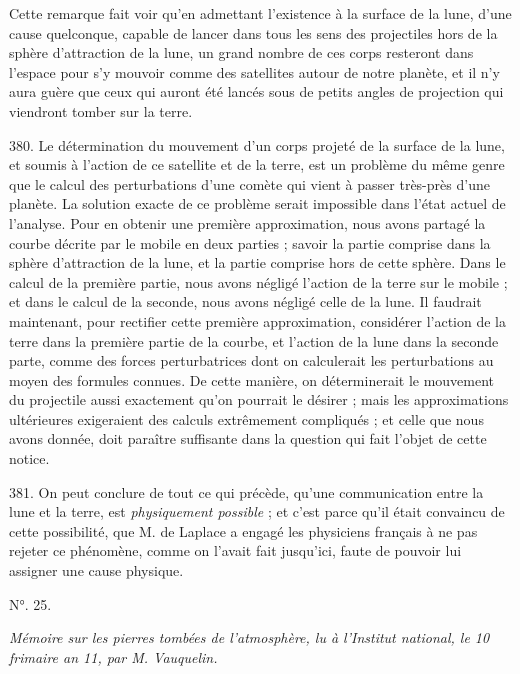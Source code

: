 \documentclass[a4paper, 11pt, oneside, polutonikogreek, french]{article}
\begin{document}
Cette remarque fait voir qu'en admettant l'existence à la surface de la lune, d'une cause quelconque, capable de lancer dans tous les sens des projectiles hors de la sphère d'attraction de la lune, un grand nombre de ces corps resteront dans l'espace pour s'y mouvoir comme des satellites autour de notre planète, et il n'y aura guère que ceux qui auront été lancés sous de petits angles de projection qui viendront tomber sur la terre.

380. Le détermination du mouvement d'un corps projeté de la surface de la lune, et soumis à l'action de ce satellite et de la terre, est un problème du même genre que le calcul des perturbations d'une comète qui vient à passer très-près d'une planète. La solution exacte de ce problème serait impossible dans l'état actuel de l'analyse. Pour en obtenir une première approximation, nous avons partagé la courbe décrite par le mobile en deux parties ; savoir la partie comprise dans la sphère d'attraction de la lune, et la partie comprise hors de cette sphère. Dans le calcul de la première partie, nous avons négligé l'action de la terre sur le mobile ; et dans le calcul de la seconde, nous avons négligé celle de la lune. Il faudrait maintenant, pour rectifier cette première approximation, considérer l'action de la terre dans la première partie de la courbe, et l'action de la lune dans la seconde parte, comme des forces perturbatrices dont on calculerait les perturbations au moyen des formules connues. De cette manière, on déterminerait le mouvement du projectile aussi exactement qu'on pourrait le désirer ; mais les approximations ultérieures exigeraient des calculs extrêmement compliqués ; et celle que nous avons donnée, doit paraître suffisante dans la question qui fait l'objet de cette notice.

381. On peut conclure de tout ce qui précède, qu'une communication entre la lune et la terre, est \emph{physiquement possible} ; et c'est parce qu'il était convaincu de cette possibilité, que M. de Laplace a engagé les physiciens français à ne pas rejeter ce phénomène, comme on l'avait fait jusqu'ici, faute de pouvoir lui assigner une cause physique.

\begin{center}
N°. 25.
\end{center}

\begin{center}
\emph{Mémoire sur les pierres tombées de l'atmosphère, lu à l'Institut national, le 10 frimaire an 11, par M. Vauquelin.}
\end{center}
\end{document}
